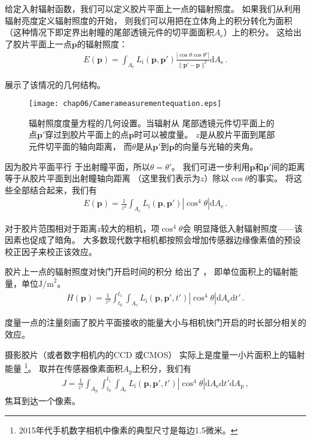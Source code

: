 给定入射辐射函数，我们可以定义胶片平面上一点的辐射照度。
如果我们从利用辐射亮度定义辐射照度的开始，
则我们可以用把在立体角上的积分转化为面积
（这种情况下即定界出射瞳的尾部透镜元件的切平面面积$A_{\mathrm{e}}$）上的积分。
这给出了胶片平面上一点$\bm p$的辐射照度：
\begin{align*}
    E({\bm p})=\int_{A_{\mathrm{e}}}{L_{\mathrm{i}}({\bm p},{\bm p}')
    \frac{|\cos\theta\cos\theta'|}{\|{\bm p}'-{\bm p}\|^2}\mathrm{d}A_{\mathrm{e}}}\, .
\end{align*}

展示了该情况的几何结构。
\begin{figure}[htbp]
    \centering\texttt{[image: chap06/Camerameasurementequation.eps]}
    \caption{辐射照度度量方程的几何设置。当辐射从
        尾部透镜元件切平面上的点$\bm p'$穿过到胶片平面上的点$\bm p$时可以被度量。
        $z$是从胶片平面到尾部元件切平面的轴向距离，
        而$\theta$是从$\bm p'$到$\bm p$的向量与光轴的夹角。}
    \label{fig:6.25}
\end{figure}

因为胶片平面平行
于出射瞳平面，所以$\theta=\theta'$。
我们可进一步利用$\bm p$和$\bm p'$间的距离等于从胶片平面到出射瞳轴向距离
（这里我们表示为$z$）除以$\cos\theta$的事实。
将这些全部结合起来，我们有
\begin{align}\label{eq:6.5}
    E({\bm p})=\frac{1}{z^2}\int_{A_{\mathrm{e}}}{L_{\mathrm{i}}({\bm p},{\bm p}')|\cos^4\theta|\mathrm{d}A_{\mathrm{e}}}\, .
\end{align}

对于胶片范围相对于距离$z$较大的相机，项$\cos^4\theta$会
明显降低入射辐射照度——该因素也促成了暗角。
大多数现代数字相机都按照会增加传感器边缘像素值的预设校正因子来校正该效应。

胶片上一点的辐射照度对快门开启时间的积分
给出了
，
即单位面积上的辐射能量，单位$\text{J/m}^2$。
\begin{align}\label{eq:6.6}
    H({\bm p})=\frac{1}{z^2}\int_{t_0}^{t_1}\int_{A_{\mathrm{e}}}
    L_{\mathrm{i}}({\bm p},{\bm p}',t')|\cos^4\theta|\mathrm{d}A_{\mathrm{e}}\mathrm{d}t'\, .
\end{align}

度量一点的注量刻画了胶片平面接收的能量大小与相机快门开启的时长部分相关的效应。

摄影胶片（或者数字相机内的CCD
或CMOS）
实际上是度量一小片面积上的辐射能量
\footnote{2015年代手机数字相机中像素的典型尺寸是每边1.5微米。}。
取并在传感器像素面积$A_{\mathrm{p}}$上积分，我们有
\begin{align}\label{eq:6.7}
    J=\frac{1}{z^2}\int_{A_{\mathrm{p}}}\int_{t_0}^{t_1}\int_{A_{\mathrm{e}}}
    L_{\mathrm{i}}({\bm p},{\bm p}',t')|\cos^4\theta|\mathrm{d}A_{\mathrm{e}}\mathrm{d}t'\mathrm{d}A_{\mathrm{p}}\, ,
\end{align}
焦耳到达一个像素。

